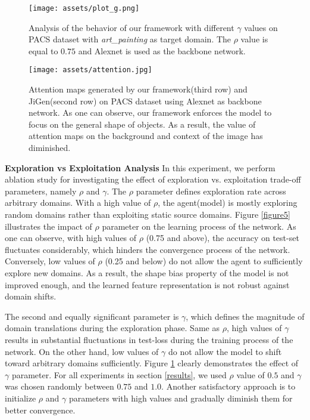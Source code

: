 \documentclass[10pt,twocolumn,letterpaper]{article}
\begin{document}
\begin{figure}[t!]
	\begin{center}
		\texttt{[image: assets/plot\_g.png]}
	\end{center}
	\caption{Analysis of the behavior of our framework with different $\gamma$ values on PACS dataset \cite{li2017deeper} with \textit{art\_painting} as target domain. The $\rho$ value is equal to $0.75$ and Alexnet is used as the backbone network.}
	\label{figur6}
\end{figure}

\begin{figure*}[t!]
	\begin{center}
		\texttt{[image: assets/attention.jpg]}
	\end{center}
	\caption{Attention maps generated by our framework(third row) and JiGen\cite{carlucci2019domain}(second row) on PACS dataset\cite{li2017deeper} using Alexnet as backbone network. As one can observe, our framework enforces the model to focus on the general shape of objects. As a result, the value of attention maps on the background and context of the image has diminished.}\label{figure7}
\end{figure*}

\vspace{2mm}
\noindent
\textbf{Exploration vs Exploitation Analysis}\quad
In this experiment, we perform ablation study for investigating the effect of exploration vs. exploitation trade-off parameters, namely $\rho$ and $\gamma$. The $\rho$ parameter defines exploration rate across arbitrary domains. With a high value of $\rho$, the agent(model) is mostly exploring random domains rather than exploiting static source domains. Figure \ref{figure5} illustrates the impact of $\rho$ parameter on the learning process of the network. 
As one can observe, with high values of $\rho$ (0.75 and above), the accuracy on test-set fluctuates considerably, which hinders the convergence process of the network. Conversely, low values of $\rho$ (0.25 and below) do not allow the agent to sufficiently explore new domains. As a result, the shape bias property of the model is not improved enough, and the learned feature representation is not robust against domain shifts.

The second and equally significant parameter is $\gamma$, which defines the magnitude of domain translations during the exploration phase. Same as $\rho$, high values of $\gamma$ results in substantial fluctuations in test-loss during the training process of the network. On the other hand, low values of $\gamma$ do not allow the model to shift toward arbitrary domains sufficiently. Figure \ref{figur6} clearly demonstrates the effect of $\gamma$ parameter.
For all experiments in section \ref{results}, we used $\rho$ value of $0.5$ and $\gamma$ was chosen randomly between $0.75$ and $1.0$.
Another satisfactory approach is to initialize $\rho$ and $\gamma$ parameters with high values and gradually diminish them for better convergence.
\end{document}
